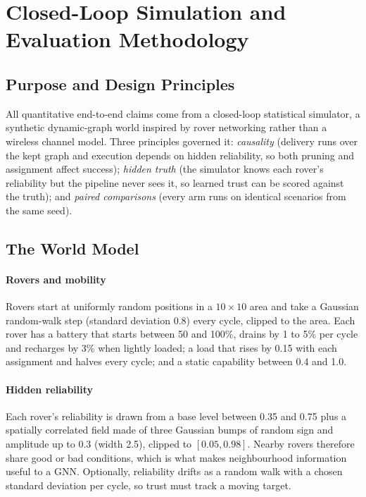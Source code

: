 \chapter{Closed-Loop Simulation and Evaluation Methodology}
\label{ch:sim}

\section{Purpose and Design Principles}

All quantitative end-to-end claims come from a closed-loop statistical
simulator, a synthetic dynamic-graph world inspired by rover networking rather
than a wireless channel model. Three principles governed it: \emph{causality}
(delivery runs over the kept graph and execution depends on hidden reliability,
so both pruning and assignment affect success); \emph{hidden truth} (the
simulator knows each rover's reliability but the pipeline never sees it, so
learned trust can be scored against the truth); and \emph{paired comparisons}
(every arm runs on identical scenarios from the same seed).

\section{The World Model}

\subsubsection{Rovers and mobility} Rovers start at uniformly random
positions in a $10\times10$ area and take a Gaussian random-walk step (standard
deviation 0.8) every cycle, clipped to the area. Each rover has a battery
that starts between 50 and 100\%, drains by 1 to 5\% per cycle and recharges
by 3\% when lightly loaded; a load that rises by 0.15 with each assignment and
halves every cycle; and a static capability between 0.4 and 1.0.

\subsubsection{Hidden reliability} Each rover's reliability is drawn from a
base level between 0.35 and 0.75 plus a spatially correlated field made of
three Gaussian bumps of random sign and amplitude up to 0.3 (width 2.5),
clipped to $[0.05,0.98]$. Nearby rovers therefore share good or bad
conditions, which is what makes neighbourhood information useful to a GNN.
Optionally, reliability drifts as a random walk with a chosen standard
deviation per cycle, so trust must track a moving target.

